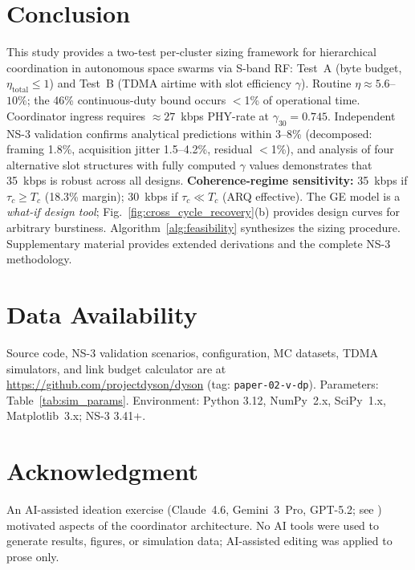 \documentclass[journal]{IEEEtran}
\begin{document}
\section{Conclusion}

This study provides a two-test per-cluster sizing framework for hierarchical coordination in autonomous space swarms via S-band RF: Test~A (byte budget, $\eta_{\text{total}} \leq 1$) and Test~B (TDMA airtime with slot efficiency $\gamma$). Routine $\eta \approx 5.6$--$10\%$; the 46\% continuous-duty bound occurs $<$1\% of operational time. Coordinator ingress requires ${\approx}27$~kbps PHY-rate at $\gamma_{30} = 0.745$. Independent NS-3 validation confirms analytical predictions within 3--8\% (decomposed: framing 1.8\%, acquisition jitter 1.5--4.2\%, residual $<$1\%), and analysis of four alternative slot structures with fully computed $\gamma$ values demonstrates that 35~kbps is robust across all designs. \textbf{Coherence-regime sensitivity:} 35~kbps if $\tau_c \geq T_c$ (18.3\% margin); 30~kbps if $\tau_c \ll T_c$ (ARQ effective). The GE model is a \emph{what-if design tool}; Fig.~\ref{fig:cross_cycle_recovery}(b) provides design curves for arbitrary burstiness. Algorithm~\ref{alg:feasibility} synthesizes the sizing procedure. Supplementary material provides extended derivations and the complete NS-3 methodology.

\section*{Data Availability}

Source code, NS-3 validation scenarios, configuration, MC datasets, TDMA simulators, and link budget calculator are at \url{https://github.com/projectdyson/dyson} (tag: \texttt{paper-02-v-dp}). Parameters: Table~\ref{tab:sim_params}. Environment: Python 3.12, NumPy~2.x, SciPy~1.x, Matplotlib~3.x; NS-3 3.41+.

\section*{Acknowledgment}

An AI-assisted ideation exercise (Claude~4.6, Gemini~3~Pro, GPT-5.2; see \cite{dyson_multimodel}) motivated aspects of the coordinator architecture. No AI tools were used to generate results, figures, or simulation data; AI-assisted editing was applied to prose only.
\end{document}

